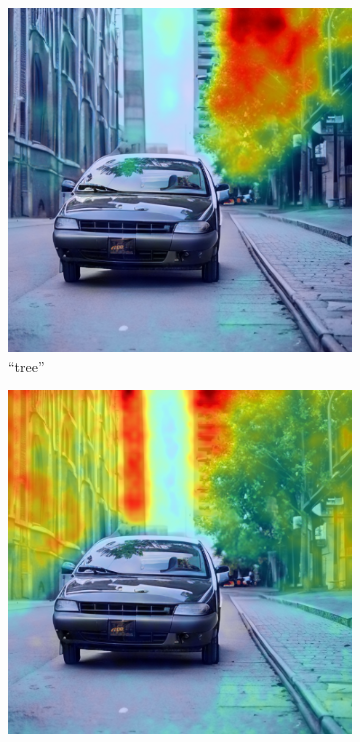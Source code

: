 \begin{figure}
\centering
  \begin{subfigure}{0.30\columnwidth}
   \includegraphics[width=\columnwidth]{img/3-methodology/example_ov_daam_heatmap_tree_without_special_tokens.png}
   \caption{``tree''}
   \label{fig:daam-ov-example-image}
  \end{subfigure}
  \begin{subfigure}{0.30\columnwidth}
   \includegraphics[width=\columnwidth]{img/3-methodology/example_ov_daam_heatmap_building_without_special_tokens.png}

\end{subfigure}
\end{figure}
